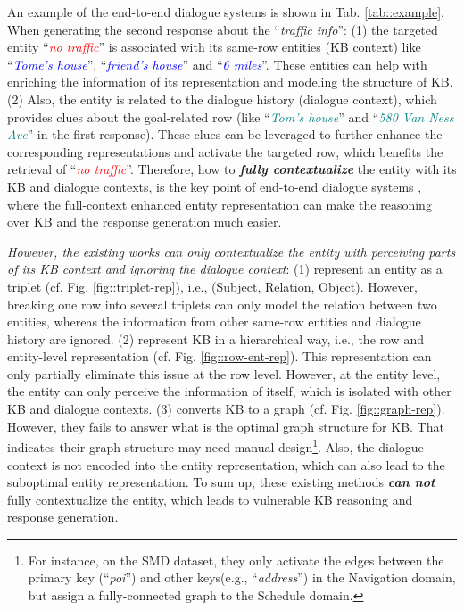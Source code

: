 \documentclass[11pt]{article}
\begin{document}
An example of the end-to-end dialogue systems is shown in Tab. \ref{tab::example}. When generating the second response about the ``\textit{traffic info}'':
(1) the targeted entity ``\textit{\textcolor{red}{no traffic}}'' is associated with its same-row entities (KB context) like ``\textit{\textcolor{blue}{Tome's house}}'',  ``\textit{\textcolor{blue}{friend's house}}'' and ``\textit{\textcolor{blue}{6 miles}}''. These entities can help with enriching the information of its representation and modeling the structure of KB. 
(2) Also, the entity is related to the dialogue history (dialogue context), which provides clues about the goal-related row (like ``\textit{\textcolor{teal}{Tom's house}}'' and ``\textit{\textcolor{teal}{580 Van Ness Ave}}'' in the first response). These clues can be leveraged to further enhance the corresponding representations and activate the targeted row, which benefits the retrieval of ``\textit{\textcolor{red}{no traffic}}''. Therefore, how to \textit{\textbf{fully contextualize}} the entity with its KB and dialogue contexts, is the key point of end-to-end dialogue systems \cite{madotto-etal-2018-mem2seq,wu2018globaltolocal,qin-etal-2020-dynamic}, where the full-context enhanced entity representation can make the reasoning over KB and the response generation much easier.



\textit{However, the existing works can only contextualize the entity with perceiving parts of its KB context and ignoring the dialogue context}: (1) \cite{madotto-etal-2018-mem2seq, wu2018globaltolocal, qin-etal-2020-dynamic} represent an entity as a triplet (cf. Fig. \ref{fig::triplet-rep}), i.e., (Subject, Relation, Object). However, breaking one row into several triplets can only model the relation between two entities, whereas the information from other same-row entities and dialogue history are ignored. (2) \cite{gangi-reddy-etal-2019-multi, qin-etal-2019-entity} represent KB in a hierarchical way, i.e., the row and entity-level representation (cf. Fig. \ref{fig::row-ent-rep}). This representation can only partially eliminate this issue at the row level. However, at the entity level, the entity can only perceive the information of itself, which is isolated with other KB and dialogue contexts. (3) \cite{yang-etal-2020-graphdialog} converts KB to a graph (cf. Fig. \ref{fig::graph-rep}). However, they fails to answer what is the optimal graph structure for KB. That indicates their graph structure may need manual design\footnote{For instance, on the SMD dataset, they only activate the edges between the primary key (``\textit{poi}'') and other keys(e.g., ``\textit{address}'') in the Navigation domain, but assign a fully-connected graph to the Schedule domain.}. Also, the dialogue context is not encoded into the entity representation, which can also lead to the suboptimal entity representation. 
To sum up, these existing methods \textit{\textbf{can not}} fully contextualize the entity, which leads to vulnerable KB reasoning and response generation.
\end{document}

